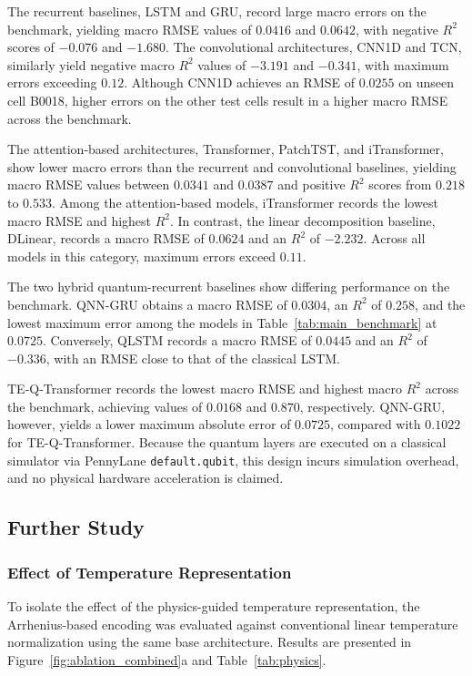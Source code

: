 \documentclass[a4paper,fleqn]{cas-sc}
\begin{document}
The recurrent baselines, LSTM and GRU, record large macro errors on the benchmark, yielding macro RMSE values of $0.0416$ and $0.0642$, with negative $R^2$ scores of $-0.076$ and $-1.680$. The convolutional architectures, CNN1D and TCN, similarly yield negative macro $R^2$ values of $-3.191$ and $-0.341$, with maximum errors exceeding $0.12$. Although CNN1D achieves an RMSE of $0.0255$ on unseen cell B0018, higher errors on the other test cells result in a higher macro RMSE across the benchmark.

The attention-based architectures, Transformer, PatchTST, and iTransformer, show lower macro errors than the recurrent and convolutional baselines, yielding macro RMSE values between $0.0341$ and $0.0387$ and positive $R^2$ scores from $0.218$ to $0.533$. Among the attention-based models, iTransformer records the lowest macro RMSE and highest $R^2$. In contrast, the linear decomposition baseline, DLinear, records a macro RMSE of $0.0624$ and an $R^2$ of $-2.232$. Across all models in this category, maximum errors exceed $0.11$.

The two hybrid quantum-recurrent baselines show differing performance on the benchmark. QNN-GRU obtains a macro RMSE of $0.0304$, an $R^2$ of $0.258$, and the lowest maximum error among the models in Table~\ref{tab:main_benchmark} at $0.0725$. Conversely, QLSTM records a macro RMSE of $0.0445$ and an $R^2$ of $-0.336$, with an RMSE close to that of the classical LSTM.

TE-Q-Transformer records the lowest macro RMSE and highest macro $R^2$ across the benchmark, achieving values of $0.0168$ and $0.870$, respectively. QNN-GRU, however, yields a lower maximum absolute error of $0.0725$, compared with $0.1022$ for TE-Q-Transformer. Because the quantum layers are executed on a classical simulator via PennyLane \texttt{default.qubit}, this design incurs simulation overhead, and no physical hardware acceleration is claimed.

\subsection{Further Study}\label{sec:ablation}

\subsubsection{Effect of Temperature Representation}\label{sec:study_temp}

To isolate the effect of the physics-guided temperature representation, the Arrhenius-based encoding was evaluated against conventional linear temperature normalization using the same base architecture. Results are presented in Figure~\ref{fig:ablation_combined}a and Table~\ref{tab:physics}.
\end{document}

